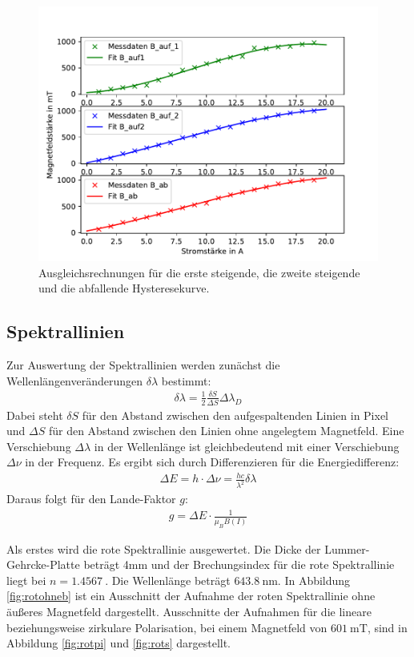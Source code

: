 \begin{figure}
  \centering
  \includegraphics{Pics/Hysterese.pdf}
  \caption{Ausgleichsrechnungen f\"ur die erste steigende, die zweite steigende und die
  abfallende Hysteresekurve.}
  \label{fig:hysterese}
\end{figure}

\subsection{Spektrallinien}

Zur Auswertung der Spektrallinien werden zun\"achst die Wellenl\"angenver\"anderungen $\delta\lambda$ bestimmt:
\begin{align}
  \delta\lambda = \frac{1}{2}\frac{\delta S}{\Delta S}\Delta\lambda_D
\end{align}
Dabei steht $\delta S$ f\"ur den Abstand zwischen den aufgespaltenden Linien in Pixel und $\Delta S$ f\"ur
den Abstand zwischen den Linien ohne angelegtem Magnetfeld. Eine Verschiebung $\Delta\lambda$ in der
Wellenl\"ange ist gleichbedeutend mit einer Verschiebung $\Delta\nu$ in der Frequenz.
Es ergibt sich durch Differenzieren
f\"ur die Energiedifferenz:
\begin{align}
  \Delta E = h\cdot\Delta\nu = \frac{hc}{\lambda^2}\delta\lambda
\end{align}
Daraus folgt für den Lande-Faktor $g$:
\begin{align}
  g = \Delta E \cdot \frac{1}{\mu_BB(I)}
\end{align}

Als erstes wird die rote Spektrallinie ausgewertet. Die Dicke der Lummer-Gehrcke-Platte beträgt 4mm
und der Brechungsindex für die rote Spektrallinie liegt bei $n=\SI{1.4567}{}$. Die Wellenlänge beträgt
$\SI{643.8}{\nano\metre}$. In Abbildung \ref{fig:rotohneb} ist ein Ausschnitt der Aufnahme der roten Spektrallinie ohne
äußeres Magnetfeld dargestellt. Ausschnitte der Aufnahmen für die lineare beziehungsweise zirkulare Polarisation, bei einem
Magnetfeld von $\SI{601}{\milli\tesla}$, sind in Abbildung
\ref{fig:rotpi} und \ref{fig:rots} dargestellt.

